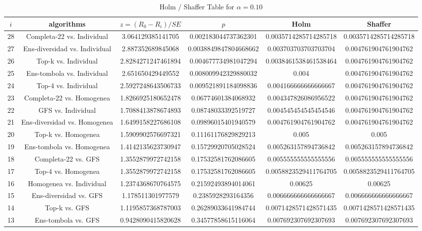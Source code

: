 \documentclass[a4paper,10pt]{article}
\begin{document}
\begin{landscape}
\begin{table}[!htp]
\centering\tiny
\caption{Holm / Shaffer Table for $\alpha=0.10$}
\begin{tabular}{cccccc}
$i$&algorithms&$z=(R_0 - R_i)/SE$&$p$&Holm&Shaffer\\
\hline
28&Completa-22 vs. Individual&3.064129385141705&0.002183044737362301&0.0035714285714285718&0.0035714285714285718\\
27&Ens-diversidad vs. Individual&2.887352689845068&0.0038849847804668662&0.003703703703703704&0.004761904761904762\\
26&Top-k vs. Individual&2.8284271247461894&0.004677734981047294&0.0038461538461538464&0.004761904761904762\\
25&Ens-tombola vs. Individual&2.651650429449552&0.008009942329880032&0.004&0.004761904761904762\\
24&Top-4 vs. Individual&2.5927248643506733&0.009521891184098836&0.004166666666666667&0.004761904761904762\\
23&Completa-22 vs. Homogenea&1.8266925180652478&0.06774601384068932&0.004347826086956522&0.004761904761904762\\
22&GFS vs. Individual&1.7088413878674893&0.08748033392519727&0.004545454545454546&0.004761904761904762\\
21&Ens-diversidad vs. Homogenea&1.6499158227686108&0.09896015401940579&0.004761904761904762&0.004761904761904762\\
20&Top-k vs. Homogenea&1.5909902576697321&0.11161176829829213&0.005&0.005\\
19&Ens-tombola vs. Homogenea&1.4142135623730947&0.15729920705028524&0.005263157894736842&0.005263157894736842\\
18&Completa-22 vs. GFS&1.3552879972742158&0.17532581762086605&0.005555555555555556&0.005555555555555556\\
17&Top-4 vs. Homogenea&1.3552879972742158&0.17532581762086605&0.0058823529411764705&0.0058823529411764705\\
16&Homogenea vs. Individual&1.2374368670764575&0.21592493894014061&0.00625&0.00625\\
15&Ens-diversidad vs. GFS&1.178511301977579&0.2385928293164356&0.006666666666666667&0.006666666666666667\\
14&Top-k vs. GFS&1.1195857368787003&0.26289033641984744&0.0071428571428571435&0.0071428571428571435\\
13&Ens-tombola vs. GFS&0.9428090415820628&0.34577858615116064&0.007692307692307693&0.007692307692307693\\

\end{tabular}
\end{table}
\end{landscape}
\end{document}
